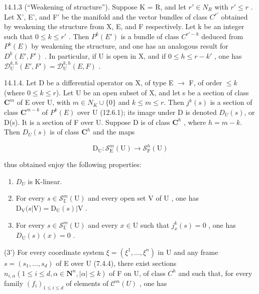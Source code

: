 14.1.3 (“Weakening of structure”). Suppose K = R, and let \(r' \in N_{R}\) with \(r' \leqslant r\) . Let X', E', and F' be the manifold and the vector bundles of class \(C^{r'}\) obtained by weakening the structure from X, E, and F respectively. Let k be an integer such that \(0 \leqslant k \leqslant r'\) . Then \(P^{k}(E')\) is a bundle of class \(C^{r'-k}\) deduced from \(P^{k}(E)\) by weakening the structure, and one has an analogous result for \(D^{k}(E', F')\) . In particular, if U is open in X, and if \(0 \leqslant h \leqslant r - k'\) , one has \(\mathcal{D}_{\mathrm{U}}^{k,h}(E', F') = \mathcal{D}_{\mathrm{U}}^{k,h}(E, F)\) .

14.1.4. Let D be a differential operator on X, of type E \(\to\) F, of order \(\leqslant k\) (where \(0 \leqslant k \leqslant r\)). Let U be an open subset of X, and let s be a section of class \(\mathbf{C}^{m}\) of E over U, with \(m \in N _{K} \cup \{0\}\) and \(k \leqslant m \leqslant r\). Then \(j^{k}(s)\) is a section of class \(\mathbf{C}^{m-k}\) of \(P^{k}(E)\) over U (12.6.1); its image under D is denoted \(D_{U}(s)\), or D(s). It is a section of F over U. Suppose D is of class \(\mathbf{C}^{h}\) , where \(h=m-k\). Then \(D_{U}(s)\) is of class \(\mathbf{C}^{h}\) and the maps

\[
\mathrm{D} _ {\mathrm{U}} \colon \mathcal {S} _ {\mathrm{E}} ^ {m} (\mathrm{U}) \rightarrow \mathcal {S} _ {\mathrm{F}} ^ {h} (\mathrm{U})
\]

thus obtained enjoy the following properties:

\begin{enumerate}
\def\labelenumi{(\arabic{enumi})}
\item
  \(D_{U}\) is K-linear.
\item
  For every \(s \in \mathcal{S}_{\mathbb{E}}^{m}(\mathrm{U})\) and every open set \(\mathrm{V}\) of \(\mathrm{U}\) , one has \(\mathrm{D}_{\mathrm{V}}(s|\mathrm{V}) = \mathrm{D}_{\mathrm{U}}(s)|\mathrm{V}\) .
\item
  For every \(s \in \mathcal{S}_{\mathbb{E}}^{m}(\mathrm{U})\) and every \(x \in \mathrm{U}\) such that \(j_{x}^{k}(s) = 0\) , one has \(D_{\mathrm{U}}(s)(x) = 0\) .
\end{enumerate}

(3') For every coordinate system \(\xi = (\xi^1, \ldots, \xi^n)\) in U and any frame \(s = (s_1, \ldots, s_d)\) of E over U (7.4.4), there exist sections \(n_{i,\alpha}(1 \leqslant i \leqslant d, \alpha \in \mathbf{N}^n, |\alpha| \leqslant k)\) of F on U, of class \(C^h\) and such that, for every family \((f_i)_{1 \leqslant i \leqslant d}\) of elements of \(\mathcal{C}^m(U)\) , one has


